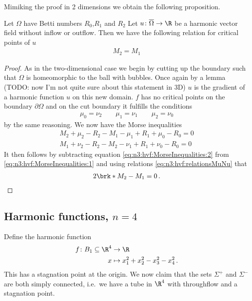 Mimiking the proof in 2 dimensions we obtain the following proposition.
\begin{proposition}
  Let $\Omega$ have Betti numbers $R_0$,$R_1$ and $R_2$
  Let $u\colon\overline{\Omega}\to\R$ be a harmonic vector field without inflow or outflow. Then we have the following relation for
  critical points of $u$
  \begin{align*}
    M_2=M_1
  \end{align*}
\end{proposition}
\begin{proof}
  As in the two-dimensional case we begin by cutting up the boundary such that $\Omega$ is homeomorphic to the ball with bubbles.
  Once again by a lemma (TODO: now I'm not quite sure about this statement in 3D) $u$ is the gradient of a harmonic function $u$ on this new domain.
  $f$ has no critical points on the boundary $\partial\Omega$ and on the cut boundary it fulfills the conditions
  \begin{align}
    \mu_0=\nu_2\qquad \mu_1=\nu_1 \qquad \mu_2=\nu_0 \label{eq:n3:hvf:relationsMuNu}
  \end{align}
  by the same reasoning. We now have the Morse inequalities
  \begin{align}
    M_2+\mu_2-R_2-M_1-\mu_1+R_1+\mu_0-R_0=0 \label{eq:n3:hvf:MorseInequalities:1} \\
    M_1+\nu_2-R_2-M_2-\nu_1+R_1+\nu_0-R_0=0 \label{eq:n3:hvf:MorseInequalities:2}
  \end{align}
  It then follows by subtracting equation \eqref{eq:n3:hvf:MorseInequalities:2} from \eqref{eq:n3:hvf:MorseInequalities:1}
  and using relations \eqref{eq:n3:hvf:relationsMuNu} that
  \begin{align*}
    2\brk*{M_2-M_1}=0\,.
  \end{align*}
\end{proof}

\newpage

\subsection*{Harmonic functions, $n=4$} 
Define the harmonic function 
\begin{align*}
  f\colon B_1\subseteq\R^4&\to \R \\
  x &\mapsto x_1^2+x_2^2-x_3^2-x_4^2\,.
\end{align*}
This has a stagnation point at the origin. We now claim that the sets $\Sigma^+$ and $\Sigma^-$ are both simply connected, i.e.\
we have a tube in $\R^4$ with throughflow and a stagnation point.

